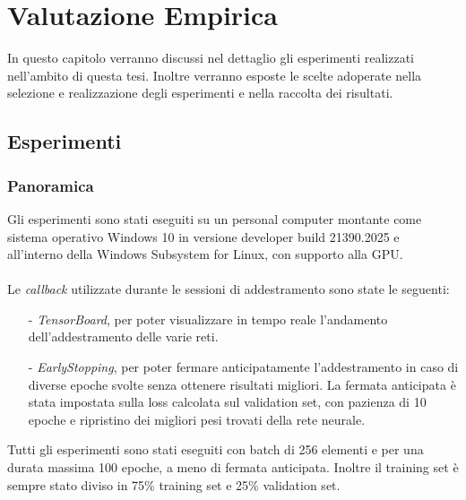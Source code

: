 \chapter{Valutazione Empirica}
In questo capitolo verranno discussi nel dettaglio gli esperimenti realizzati nell'ambito di questa tesi. Inoltre verranno esposte le scelte adoperate nella selezione e realizzazione degli esperimenti e nella raccolta dei risultati.
\section{Esperimenti}
\subsection{Panoramica} 
Gli esperimenti sono stati eseguiti su un personal computer montante come sistema operativo Windows 10 in versione developer build 21390.2025 e all'interno della Windows Subsystem for Linux, con supporto alla GPU.\\\\%
Le \textit{callback} utilizzate durante le sessioni di addestramento sono state le seguenti:
\begin{itemize}
    \item[-] \textit{TensorBoard}, per poter visualizzare in tempo reale l'andamento dell'addestramento delle varie reti.
    
    \item[-] \textit{EarlyStopping}, per poter fermare anticipatamente l'addestramento in caso di diverse epoche svolte senza ottenere risultati migliori. La fermata anticipata è stata impostata sulla loss calcolata sul validation set, con pazienza di 10 epoche e ripristino dei migliori pesi trovati della rete neurale.
    
\end{itemize}
Tutti gli esperimenti sono stati eseguiti con batch di 256 elementi e per una durata massima 100 epoche, a meno di fermata anticipata. Inoltre il training set è sempre stato diviso in 75\% training set e 25\% validation set.

